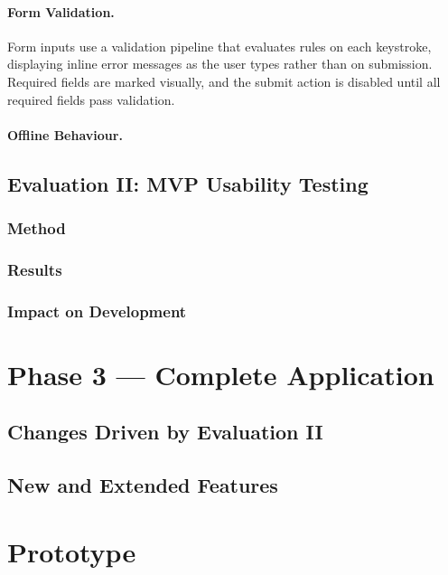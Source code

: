 \paragraph{Form Validation.}
Form inputs use a validation pipeline that evaluates rules on each keystroke, displaying inline error messages as the user types rather than on submission.
Required fields are marked visually, and the submit action is disabled until all required fields pass validation.

\paragraph{Offline Behaviour.}



\subsection{Evaluation II: MVP Usability Testing}
\subsubsection{Method}
\subsubsection{Results}
\subsubsection{Impact on Development}
\section{Phase 3 --- Complete Application}
\subsection{Changes Driven by Evaluation II}
\subsection{New and Extended Features}

\section{Prototype}




